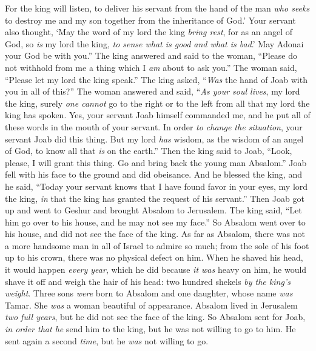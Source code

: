 \begin{biblechapter}
\verse For the king will listen, to deliver his servant from the hand of the man \textit{who seeks} to destroy me and my son together from the inheritance of God.’
\verse Your servant also thought, ‘May the word of my lord the king \textit{bring rest}, for as an angel of God, so \textit{is} my lord the king, \textit{to sense what is good and what is bad}.’ May Adonai your God be with you.”
\verse The king answered and said to the woman, “Please do not withhold from me a thing which I \textit{am} about to ask you.” The woman said, “Please let my lord the king speak.”
\verse The king asked, “\textit{Was} the hand of Joab with you in all of this?” The woman answered and said, “\textit{As your soul lives}, my lord the king, surely \textit{one cannot} go to the right or to the left from all that my lord the king has spoken. Yes, your servant Joab himself commanded me, and he put all of these words in the mouth of your servant.
\verse In order \textit{to change the situation}, your servant Joab did this thing. But my lord \textit{has} wisdom, as the wisdom of an angel of God, to know all that \textit{is} on the earth.”
\verse Then the king said to Joab, “Look, please, I will grant this thing. Go and bring back the young man Absalom.”
\verse Joab fell with his face to the ground and did obeisance. And he blessed the king, and he said, “Today your servant knows that I have found favor in your eyes, my lord the king, \textit{in} that the king has granted the request of his servant.”
 Then Joab got up and went to Geshur and brought Absalom to Jerusalem.
\verse The king said, “Let him go over to his house, and he may not see my face.” So Absalom went over to his house, and did not see the face of the king.
\verse As far as Absalom, there was not a more handsome man in all of Israel to admire so much; from the sole of his foot up to his crown, there was no physical defect on him.
\verse When he shaved his head, it would happen \textit{every year}, which he did because \textit{it was} heavy on him, he would shave it off and weigh the hair of his head: two hundred shekels \textit{by the king’s weight}.
\verse Three sons \textit{were} born to Absalom and one daughter, whose name \textit{was} Tamar. She \textit{was} a woman beautiful of appearance.
\verse Absalom lived in Jerusalem \textit{two full years}, but he did not see the face of the king.
\verse So Absalom sent for Joab, \textit{in order that he} send him to the king, but he was not willing to go to him. He sent again a second \textit{time}, but he \textit{was} not willing to go.

\end{biblechapter}
